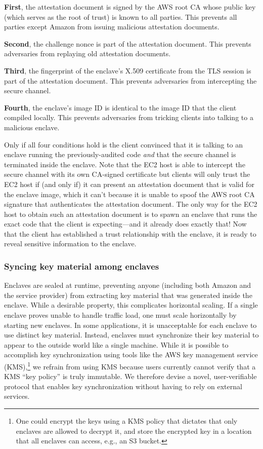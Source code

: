 {\bf First}, the attestation document is signed by the AWS root CA whose public
key (which serves as the root of trust) is known to all parties.  This prevents
all parties except Amazon from issuing malicious attestation documents.

{\bf Second}, the challenge nonce is part of the attestation document.  This
prevents adversaries from replaying old attestation documents.

{\bf Third}, the fingerprint of the enclave's X.509 certificate from the TLS
session is part of the attestation document.  This prevents adversaries from
intercepting the secure channel.

{\bf Fourth}, the enclave's image ID is identical to the image ID that the
client compiled locally.  This prevents adversaries from tricking clients into
talking to a malicious enclave.

Only if all four conditions hold is the client convinced that it is talking to
an enclave running the previously-audited code \emph{and} that the secure
channel is terminated inside the enclave.  Note that the EC2 host is able to
intercept the secure channel with its own CA-signed certificate but clients will
only trust the EC2 host if (and only if) it can present an attestation document
that is valid for the enclave image, which it can't because it is unable to
spoof the AWS root CA signature that authenticates the attestation document.
The only way for the EC2 host to obtain such an attestation document is to spawn
an enclave that runs the exact code that the client is expecting---and it
already does exactly that!  Now that the client has established a trust
relationship with the enclave, it is ready to reveal sensitive information to
the enclave.

\subsubsection{Syncing key material among enclaves}%
\label{sec:sync}

Enclaves are sealed at runtime, preventing anyone (including both Amazon and the
service provider) from extracting key material that was generated inside the
enclave.  While a desirable property, this complicates horizontal scaling.  If a
single enclave proves unable to handle traffic load, one must scale horizontally
by starting new enclaves.  In some applications, it is unacceptable for each
enclave to use distinct key material.  Instead, enclaves must synchronize their
key material to appear to the outside world like a single machine.  While it is
possible to accomplish key synchronization using tools like the AWS key
management service (KMS),\footnote{One could encrypt the keys using a KMS policy
that dictates that only enclaves are allowed to decrypt it, and store the
encrypted key in a location that all enclaves can access, e.g., an S3 bucket.}
we refrain from using KMS because users currently cannot verify that a
KMS ``key policy'' is truly immutable.  We therefore devise a novel,
user-verifiable protocol that enables key synchronization without having to rely
on external services.

